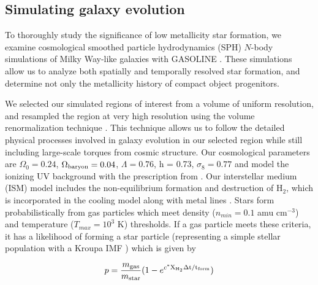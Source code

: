 \documentclass[nofootinbib,twocolumn,prd]{emulateapj}
\begin{document}
\subsection{Simulating galaxy evolution}
To thoroughly study the significance of low metallicity star
formation, we examine cosmological smoothed particle hydrodynamics
(SPH) $N$-body simulations of Milky Way-like galaxies with GASOLINE
\citep{Stadel01,Wadsley04}.  These simulations allow us to analyze both
spatially and temporally resolved star formation, and determine not
only the metallicity history of compact object progenitors.%

We selected our simulated regions of interest from a volume of
uniform resolution, and resampled the region at very high
resolution using the volume renormalization technique \citep{Katz93}.
This technique allows us to follow the detailed physical processes
involved in galaxy evolution in our selected region while still
including large-scale torques from cosmic structure.  Our cosmological parameters are $\Omega_0 = 0.24$, $\Omega_{\rm baryon} = 0.04$, $\Lambda = 0.76$, h = 0.73, $\sigma_8 = 0.77$ 
 \citep{WMAP3} and model the ionizing UV background
with the prescription from \citet{Haardt96}.  Our interstellar medium (ISM) model includes the non-equilibrium formation and destruction of H$_2$, which is incorporated in the cooling model along with metal lines \citep{Christensen12}.  Stars form
probabilistically from gas particles which meet density ($n_{min} =
0.1$ amu cm$^{-3}$) and temperature ($T_{max} = 10^3$ K) thresholds. If a gas
particle meets these criteria, it has a likelihood of forming a star
particle (representing a simple stellar population with a Kroupa IMF
\citep{Kroupa}) which is given by

\begin{equation}
p = \frac{m_{\rm gas}}{m_{\rm star}} (1 - e^{c^*\rm X_{\rm H_2} \Delta t/t_{\rm form}})
\end{equation}
\end{document}
